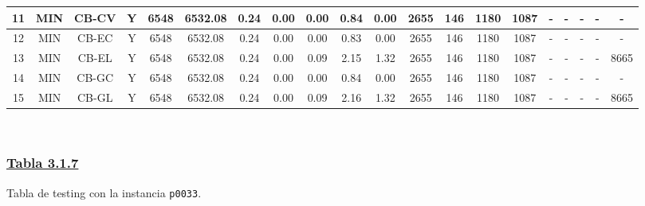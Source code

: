 {\begin{tabular}{ *{19}{c|} c }
\hline
11 & MIN & CB-CV & Y & 6548 & 6532.08 & 0.24 & 0.00 & 0.00 & 0.84 & 0.00 & 2655 & 146 & 1180 & 1087 & - & - & - & - & -\\
\hline
12 & MIN & CB-EC & Y & 6548 & 6532.08 & 0.24 & 0.00 & 0.00 & 0.83 & 0.00 & 2655 & 146 & 1180 & 1087 & - & - & - & - & -\\
\hline
13 & MIN & CB-EL & Y & 6548 & 6532.08 & 0.24 & 0.00 & 0.09 & 2.15 & 1.32 & 2655 & 146 & 1180 & 1087 & - & - & - & - & 8665\\
\hline
14 & MIN & CB-GC & Y & 6548 & 6532.08 & 0.24 & 0.00 & 0.00 & 0.84 & 0.00 & 2655 & 146 & 1180 & 1087 & - & - & - & - & -\\
\hline
15 & MIN & CB-GL & Y & 6548 & 6532.08 & 0.24 & 0.00 & 0.09 & 2.16 & 1.32 & 2655 & 146 & 1180 & 1087 & - & - & - & - & 8665\\
\hline
\end{tabular}\\
\vspace{4mm}
}

\newpage

\subsubsection*{\underline{Tabla 3.1.7}}
\noindent Tabla de testing con la instancia \verb_p0033_.\\

